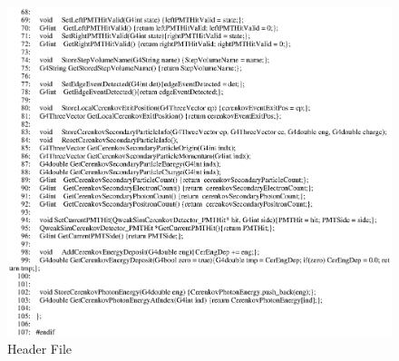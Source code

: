 \begin{figure}[h]
  \hspace{0cm}
  \includegraphics[scale=0.8]{./figures18/QweakSimUserInformation.hh-p2.eps}
  \caption{\label{SourceXVIII2} Header File}
           \label{fig:XVIII-SC-2}
\end{figure}
\clearpage

